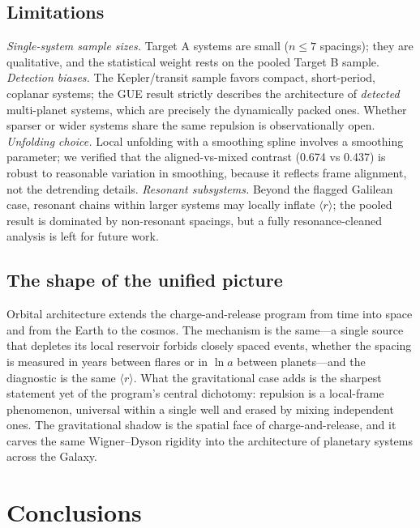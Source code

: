 \documentclass[12pt,a4paper]{article}
\begin{document}
\subsection{Limitations}

\emph{Single-system sample sizes.} Target A systems are small ($n\le7$ spacings); they are qualitative, and the statistical weight rests on the pooled Target B sample. \emph{Detection biases.} The Kepler/transit sample favors compact, short-period, coplanar systems; the GUE result strictly describes the architecture of \emph{detected} multi-planet systems, which are precisely the dynamically packed ones. Whether sparser or wider systems share the same repulsion is observationally open. \emph{Unfolding choice.} Local unfolding with a smoothing spline involves a smoothing parameter; we verified that the aligned-vs-mixed contrast (0.674 vs 0.437) is robust to reasonable variation in smoothing, because it reflects frame alignment, not the detrending details. \emph{Resonant subsystems.} Beyond the flagged Galilean case, resonant chains within larger systems may locally inflate $\langle r\rangle$; the pooled result is dominated by non-resonant spacings, but a fully resonance-cleaned analysis is left for future work.

\subsection{The shape of the unified picture}

Orbital architecture extends the charge-and-release program from time into space and from the Earth to the cosmos. The mechanism is the same---a single source that depletes its local reservoir forbids closely spaced events, whether the spacing is measured in years between flares or in $\ln a$ between planets---and the diagnostic is the same $\langle r\rangle$. What the gravitational case adds is the sharpest statement yet of the program's central dichotomy: repulsion is a local-frame phenomenon, universal within a single well and erased by mixing independent ones. The gravitational shadow is the spatial face of charge-and-release, and it carves the same Wigner--Dyson rigidity into the architecture of planetary systems across the Galaxy.

\section{Conclusions}
\end{document}
